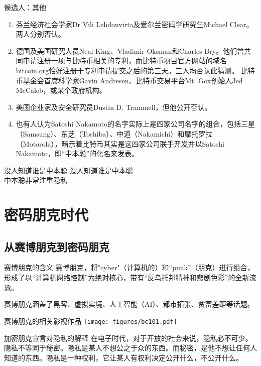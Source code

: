 \documentclass[11pt]{beamer}
\begin{document}
\begin{frame}{候选人：其他}
\begin{enumerate}
	\small
	\item 芬兰经济社会学家Dr Vili Lehdonvirta及爱尔兰密码学研究生Michael Clear。两人分别否认。
	\item 德国及美国研究人员Neal King、Vladimir Oksman和Charles Bry。他们曾共同申请注册一项与比特币相关的专利，而比特币项目官方网站的域名bitcoin.org恰好注册于专利申请提交之后的第三天。三人均否认此猜测。
	比特币基金会首席科学家Gavin Andresen、比特币交易平台Mt. Gox创始人Jed McCaleb，或某个政府机构。
	\item 美国企业家及安全研究员Dustin D. Trammell，但他公开否认。
	\item 也有人认为Satoshi Nakamoto的名字实际上是四家公司名字的组合，包括三星（Samsung）、东芝（Toshiba）、中道（Nakamichi）和摩托罗拉（Motorola），暗示着比特币其实是这四家公司联手开发并以Satoshi Nakamoto，即“中本聪”的化名来发表。
\end{enumerate}
\end{frame}

\begin{frame}{没人知道谁是中本聪}
		\centering
		没人知道谁是中本聪\\
		中本聪非常注重隐私
\end{frame}

\section{密码朋克时代}
\subsection{从赛博朋克到密码朋克}
\begin{frame}{赛博朋克的含义}
	赛博朋克，将"cyber"（计算机的）和“punk”（朋克）进行组合，形成了以“计算机网络控制”为绝对核心，带有“反乌托邦精神和悲剧色彩”的全新流派。
	
	赛博朋克涵盖了黑客、虚拟实境、人工智能（AI）、都市拓张、贫富差距等话题。
\end{frame}

\begin{frame}{赛博朋克的相关影视作品}
	\centering
	\texttt{[image: figures/bc101.pdf]}
\end{frame}

\begin{frame}{加密朋克宣言对隐私的解释}
	在电子时代，对于开放的社会来说，隐私必不可少。隐私不等同于秘密。隐私是某人不想公之于众的东西。而秘密，是他不想让任何人知道的东西。{\color{red}隐私是一种权利}，它让某人有权利决定公开什么，不公开什么。
	
	\hfill
	
\end{frame}
\end{document}
